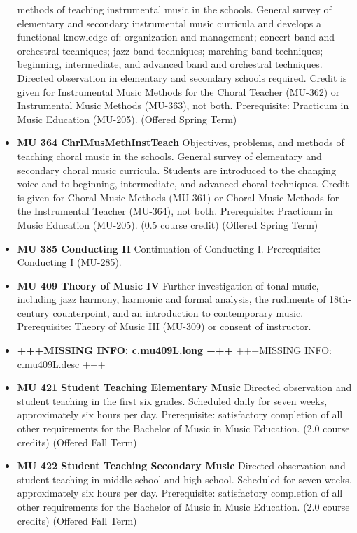 \documentclass[
  letterpaper,
]{scrbook}
\begin{document}
\begin{itemize}
  methods of teaching instrumental music in the schools. General survey
  of elementary and secondary instrumental music curricula and develops
  a functional knowledge of: organization and management; concert band
  and orchestral techniques; jazz band techniques; marching band
  techniques; beginning, intermediate, and advanced band and orchestral
  techniques. Directed observation in elementary and secondary schools
  required. Credit is given for Instrumental Music Methods for the
  Choral Teacher (MU-362) or Instrumental Music Methods (MU-363), not
  both. Prerequisite: Practicum in Music Education (MU-205). (Offered
  Spring Term)
\item
  \textbf{MU 364 ChrlMusMethInstTeach} Objectives, problems, and methods
  of teaching choral music in the schools. General survey of elementary
  and secondary choral music curricula. Students are introduced to the
  changing voice and to beginning, intermediate, and advanced choral
  techniques. Credit is given for Choral Music Methods (MU-361) or
  Choral Music Methods for the Instrumental Teacher (MU-364), not both.
  Prerequisite: Practicum in Music Education (MU-205). (0.5 course
  credit) (Offered Spring Term)
\item
  \textbf{MU 385 Conducting II} Continuation of Conducting I.
  Prerequisite: Conducting I (MU-285).
\item
  \textbf{MU 409 Theory of Music IV} Further investigation of tonal
  music, including jazz harmony, harmonic and formal analysis, the
  rudiments of 18th-century counterpoint, and an introduction to
  contemporary music. Prerequisite: Theory of Music III (MU-309) or
  consent of instructor.
\item
  \textbf{+++MISSING INFO: c.mu409L.long +++} +++MISSING INFO:
  c.mu409L.desc +++
\item
  \textbf{MU 421 Student Teaching Elementary Music} Directed observation
  and student teaching in the first six grades. Scheduled daily for
  seven weeks, approximately six hours per day. Prerequisite:
  satisfactory completion of all other requirements for the Bachelor of
  Music in Music Education. (2.0 course credits) (Offered Fall Term)
\item
  \textbf{MU 422 Student Teaching Secondary Music} Directed observation
  and student teaching in middle school and high school. Scheduled for
  seven weeks, approximately six hours per day. Prerequisite:
  satisfactory completion of all other requirements for the Bachelor of
  Music in Music Education. (2.0 course credits) (Offered Fall Term)

\end{itemize}
\end{document}
